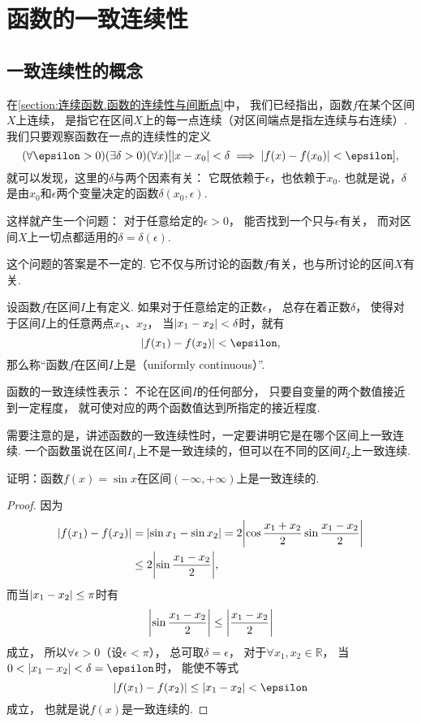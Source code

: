 \section{函数的一致连续性}
\subsection{一致连续性的概念}
在\cref{section:连续函数.函数的连续性与间断点}中，
我们已经指出，函数\(f\)在某个区间\(X\)上连续，
是指它在区间\(X\)上的每一点连续（对区间端点是指左连续与右连续）.
我们只要观察函数在一点的连续性的定义\[
	(\forall\epsilon>0)
	(\exists\delta>0)
	(\forall x)
	[
		\abs{x - x_0} < \delta
		\implies
		\abs{f(x) - f(x_0)} < \epsilon
	],
\]
就可以发现，这里的\(\delta\)与两个因素有关：
它既依赖于\(\epsilon\)，也依赖于\(x_0\).
也就是说，\(\delta\)是由\(x_0\)和\(\epsilon\)两个变量决定的函数\(\delta(x_0,\epsilon)\).

这样就产生一个问题：
对于任意给定的\(\epsilon>0\)，
能否找到一个只与\(\epsilon\)有关，
而对区间\(X\)上一切点都适用的\(\delta=\delta(\epsilon)\).

这个问题的答案是不一定的.
它不仅与所讨论的函数\(f\)有关，也与所讨论的区间\(X\)有关.

\begin{definition}\label{definition:极限.函数的一致连续性}
设函数\(f\)在区间\(I\)上有定义.
如果对于任意给定的正数\(\epsilon\)，
总存在着正数\(\delta\)，
使得对于区间\(I\)上的任意两点\(x_1\)、\(x_2\)，
当\(\abs{x_1 - x_2} < \delta\)时，就有\[
	\abs{f(x_1) - f(x_2)} < \epsilon,
\]
那么称“函数\(f\)在区间\(I\)上是（uniformly continuous）”.
\end{definition}
函数的一致连续性表示：
不论在区间\(I\)的任何部分，
只要自变量的两个数值接近到一定程度，
就可使对应的两个函数值达到所指定的接近程度.

需要注意的是，讲述函数的一致连续性时，一定要讲明它是在哪个区间上一致连续.
一个函数虽说在区间\(I_1\)上不是一致连续的，但可以在不同的区间\(I_2\)上一致连续.

\begin{example}
证明：函数\(f(x)=\sin x\)在区间\((-\infty,+\infty)\)上是一致连续的.
\begin{proof}
因为\begin{align*}
	\abs{f(x_1)-f(x_2)}
	&= \abs{\sin x_1 - \sin x_2}
	= 2\abs{\cos\frac{x_1+x_2}{2} \sin\frac{x_1-x_2}{2}} \\
	&\leq 2\abs{\sin\frac{x_1-x_2}{2}},
\end{align*}
而当\(\abs{x_1-x_2} \leq \pi\)时有\[
	\abs{\sin\frac{x_1-x_2}{2}} \leq \abs{\frac{x_1-x_2}{2}}
\]成立，
所以\(\forall\epsilon>0\)（设\(\epsilon<\pi\)），
总可取\(\delta=\epsilon\)，
对于\(\forall x_1,x_2\in\mathbb{R}\)，
当\(0<\abs{x_1-x_2}<\delta=\epsilon\)时，
能使不等式\[
	\abs{f(x_1)-f(x_2)} \leq \abs{x_1-x_2} < \epsilon
\]成立，
也就是说\(f(x)\)是一致连续的.
\end{proof}
\end{example}

